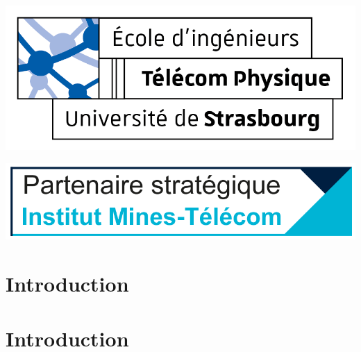 \documentclass[12pt,a4paper]{report}
\newcommand*\sectiontitle{}
\let\origsection\section
\renewcommand*{\section}[2][]{%
\ifx\setminus#1\setminus%
  \origsection{#2}%
  \renewcommand*\sectiontitle{#2}%
\else
  \origsection[#1]{#2}%
  \renewcommand*\sectiontitle{#1}%
\fi
}
\begin{document}
\begin{titlepage}
    \begin{center}
        \begin{minipage}{0.45\textwidth}
            \includegraphics[width=\textwidth]{images/logo-tps.png}
        \end{minipage}
        \hfill
        \begin{minipage}{0.45\textwidth}
            \includegraphics[width=\textwidth]{images/logo_imt.png}
        \end{minipage}
    \end{center}
    
    \vspace{1.5cm} %

    
    \vfill %
    
\end{titlepage}

\thispagestyle{tocstyle}



\tableofcontents %
\clearpage %

\pagestyle{plain} %


\section{Introduction}
\end{document}
